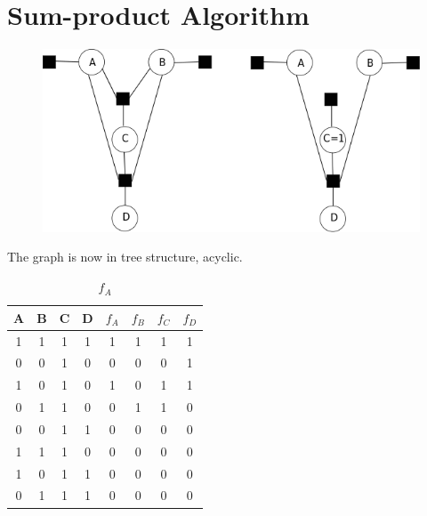 \documentclass{article}
\begin{document}
\section{Sum-product Algorithm}
\begin{figure}[htb!]
\includegraphics[width = \textwidth]{ex01.png}
\end{figure}

The graph is now in tree structure, acyclic.
\begin{table}[htb]
\caption{$f_A$}
\centering
  \begin{tabular}{ | c | c | c | c | c | c | c | c |}
    \hline
    A & B & C & D & $f_A$ & $f_B$ & $f_C$ & $f_D$ \\ \hline
    1 & 1 & 1 & 1 & 1 & 1 & 1 & 1\\\hline
    0 & 0 & 1 & 0 & 0 & 0 & 0 & 1\\\hline
    1 & 0 & 1 & 0 & 1 & 0 & 1 & 1\\\hline
    0 & 1 & 1 & 0 & 0 & 1 & 1 & 0\\\hline
	0 & 0 & 1 & 1 & 0 & 0 & 0 & 0\\\hline
	1 & 1 & 1 & 0 & 0 & 0 & 0 & 0\\\hline
	1 & 0 & 1 & 1 & 0 & 0 & 0 & 0\\\hline
	0 & 1 & 1 & 1 & 0 & 0 & 0 & 0\\\hline

  \end{tabular}
\end{table}
\end{document}
